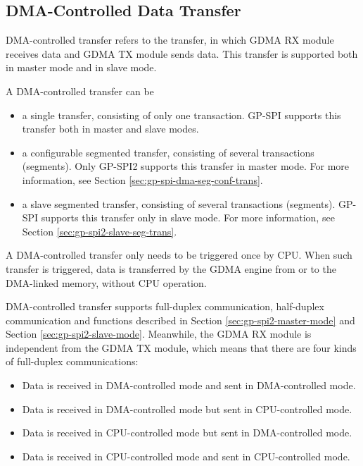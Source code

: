 \documentclass[main\_\_EN.tex]{subfiles}
\begin{document}
\subsection{DMA-Controlled Data Transfer}\label{sec:usage-of-gp-spi2-dma-controlled-mode}

DMA-controlled transfer refers to the transfer, in which GDMA RX module receives data and GDMA TX module sends data. This transfer is supported both in master mode and in slave mode.

A DMA-controlled transfer can be

\begin{itemize}
    \item a single transfer, consisting of only one transaction. GP-SPI supports this transfer both in master and slave modes.
    \item a configurable segmented transfer, consisting of several transactions (segments). Only GP-SPI2 supports this transfer in master mode. For more information, see Section \ref{sec:gp-spi-dma-seg-conf-trans}.
    \item a slave segmented transfer, consisting of several transactions (segments). GP-SPI supports this transfer only in slave mode. For more information, see Section \ref{sec:gp-spi2-slave-seg-trans}.
\end{itemize}

A DMA-controlled transfer only needs to be triggered once by CPU. When such transfer is triggered, data is transferred by the GDMA engine from or to the DMA-linked memory, without CPU operation.

DMA-controlled transfer supports full-duplex communication, half-duplex communication and functions described in Section \ref{sec:gp-spi2-master-mode} and Section \ref{sec:gp-spi2-slave-mode}. Meanwhile, the GDMA RX module is independent from the GDMA TX module, which means that there are four kinds of full-duplex communications:

\begin{itemize}
    \item Data is received in DMA-controlled mode and sent in DMA-controlled mode.

    \item Data is received in DMA-controlled mode but sent in CPU-controlled mode.

    \item Data is received in CPU-controlled mode but sent in DMA-controlled mode.

    \item Data is received in CPU-controlled mode and sent in CPU-controlled mode.

\end{itemize}
\end{document}
